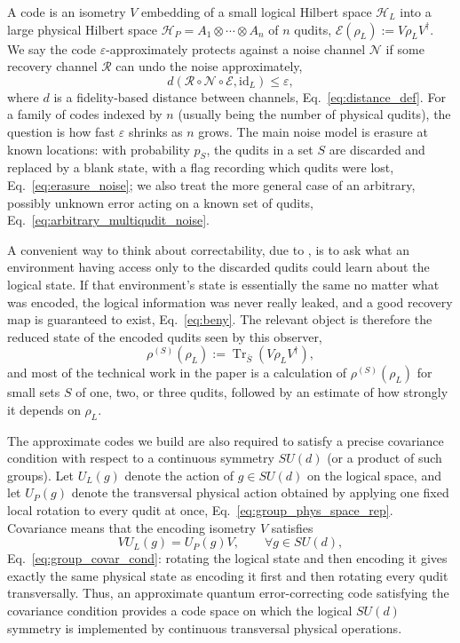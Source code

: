 \documentclass[10pt,twocolumn,superscriptaddress,aps,amsmath,amssymb,citeautoscript,floatfix,prx]{revtex4-2}
\theoremstyle{plain}
\theoremstyle{plain}
\theoremstyle{plain}
\theoremstyle{plain}
\theoremstyle{plain}
\theoremstyle{plain}
\begin{document}
A code is an isometry $V$ embedding of a small logical Hilbert space $\mathcal H_L$ into a large physical Hilbert space $\mathcal H_P=A_1\otimes\cdots\otimes A_n$ of $n$ qudits, $\mathcal E(\rho_L):=V\rho_LV^\dagger$. We say the code $\varepsilon$-approximately protects against a noise channel $\mathcal N$ if some recovery channel $\mathcal R$ can undo the noise approximately,
$$
d(\mathcal R\circ\mathcal N\circ\mathcal E,\mathrm{id}_L)\le \varepsilon,
$$
where $d$ is a fidelity-based distance between channels, Eq.~\eqref{eq:distance_def}. For a family of codes indexed by $n$ (usually being the number of physical qudits), the question is how fast $\varepsilon$ shrinks as $n$ grows. The main noise model is erasure at known locations: with probability $p_S$, the qudits in a set $S$ are discarded and replaced by a blank state, with a flag recording which qudits were lost, Eq.~\eqref{eq:erasure_noise}; we also treat the more general case of an arbitrary, possibly unknown error acting on a known set of qudits, Eq.~\eqref{eq:arbitrary_multiqudit_noise}.
 
A convenient way to think about correctability, due to \citet{Beny2010}, is to ask what an environment having access only to the discarded qudits could learn about the logical state. If that environment's state is essentially the same no matter what was encoded, the logical information was never really leaked, and a good recovery map is guaranteed to exist, Eq.~\eqref{eq:beny}. The relevant object is therefore the reduced state of the encoded qudits seen by this observer,
$$
\rho^{(S)}(\rho_L):=\operatorname{Tr}_{\bar S}\!\left(V\rho_LV^\dagger\right),
$$
and most of the technical work in the paper is a calculation of $\rho^{(S)}(\rho_L)$ for small sets $S$ of one, two, or three qudits, followed by an estimate of how strongly it depends on $\rho_L$.
 
The approximate codes we build are also required to satisfy a precise covariance condition with respect to a continuous symmetry $SU(d)$ (or a product of such groups). Let $U_L(g)$ denote the action of $g\in SU(d)$ on the logical space, and let $U_P(g)$ denote the transversal physical action obtained by applying one fixed local rotation to every qudit at once, Eq.~\eqref{eq:group_phys_space_rep}. Covariance means that the encoding isometry $V$ satisfies
$$
VU_L(g)=U_P(g)V,\qquad \forall g\in SU(d),
$$
Eq.~\eqref{eq:group_covar_cond}: rotating the logical state and then encoding it gives exactly the same physical state as encoding it first and then rotating every qudit transversally. Thus, an approximate quantum error-correcting code satisfying the covariance condition provides a code space on which the logical $SU(d)$ symmetry is implemented by continuous transversal physical operations.
\end{document}

